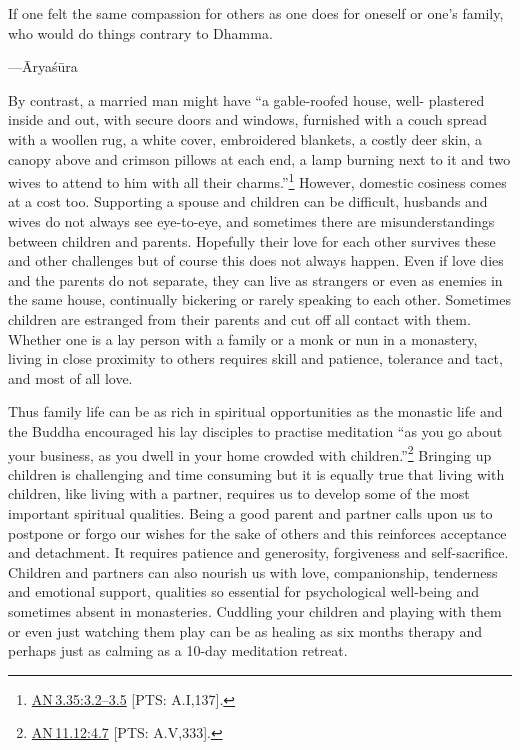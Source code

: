 \documentclass[10pt, openright]{book}
\newenvironment{epigram-2}%
{%
\vspace{1em}
\noindent
\quoting[leftmargin=2.5cm,rightmargin=2.5cm]%
\begin{itshape}
\large
}%
{\end{itshape}\endquoting
}%
\newenvironment{epigram-2-cite}%
{%
\quoting[leftmargin=2.5cm,rightmargin=2.5cm]%
\noindent\normal\hspace*{\fill} 
}%
{\endquoting\vspace{1em}
}%
\begin{document}
\begin{epigram-2}
If one felt the same compassion for others as one does for oneself or one’s family, who would do things contrary to Dhamma.
\end{epigram-2}

\begin{epigram-2-cite}
—Āryaśūra
\end{epigram-2-cite}

By contrast, a married man might have “a gable-roofed house, well- plastered inside and out, with secure doors and windows, furnished with a couch spread with a woollen rug, a white cover, embroidered blankets, a costly deer skin, a canopy above and crimson pillows at each end, a lamp burning next to it and two wives to attend to him with all their charms.”\footnote {\href{https://suttacentral.net/an3.35/en/sujato\#3.2}{AN 3.35:3.2–3.5} [PTS: A.I,137].} However, domestic cosiness comes at a cost too. Supporting a spouse and children can be difficult, husbands and wives do not always see eye-to-eye, and sometimes there are misunderstandings between children and parents. Hopefully their love for each other survives these and other challenges but of course this does not always happen. Even if love dies and the parents do not separate, they can live as strangers or even as enemies in the same house, continually bickering or rarely speaking to each other. Sometimes children are estranged from their parents and cut off all contact with them. Whether one is a lay person with a family or a monk or nun in a monastery, living in close proximity to others requires skill and patience, tolerance and tact, and most of all love.


Thus family life can be as rich in spiritual opportunities as the monastic life and the Buddha encouraged his lay disciples to practise meditation “as you go about your business, as you dwell in your home crowded with children.”\footnote {\href{https://suttacentral.net/an11.12/en/sujato\#4.7}{AN 11.12:4.7} [PTS: A.V,333].} Bringing up children is challenging and time consuming but it is equally true that living with children, like living with a partner, requires us to develop some of the most important spiritual qualities. Being a good parent and partner calls upon us to postpone or forgo our wishes for the sake of others and this reinforces acceptance and detachment. It requires patience and generosity, forgiveness and self-sacrifice. Children and partners can also nourish us with love, companionship, tenderness and emotional support, qualities so essential for psychological well-being and sometimes absent in monasteries. Cuddling your children and playing with them or even just watching them play can be as healing as six months therapy and perhaps just as calming as a 10-day meditation retreat.
\end{document}
